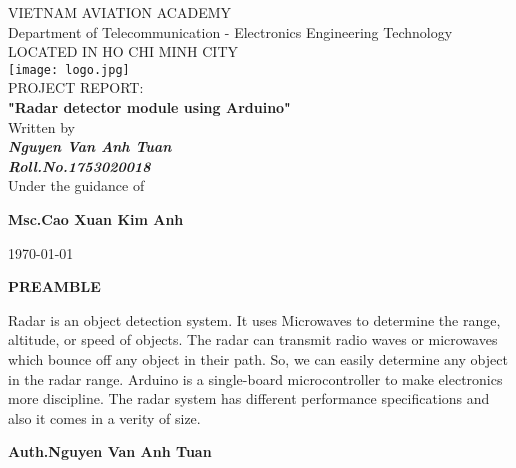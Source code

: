 \documentclass[13pt,a4paper]{report}
\begin{document}
    \newpage
        \centering
        \LARGE{\textsc{VIETNAM AVIATION ACADEMY}}\\
        \vspace{3mm}
        \normalsize{Department of Telecommunication - Electronics Engineering Technology} \\
        \vspace{3mm}
        \large{LOCATED IN HO CHI MINH CITY} \\
        \vspace{3mm}
        \texttt{[image: logo.jpg]} \\
        \vspace{3mm}
        \normalsize{PROJECT REPORT: } \\ 
        \vspace{15mm}
        \huge{\textbf{"Radar detector module using Arduino"}} \\
        \vspace{20mm}
        \normalsize{Written by} \\
        \vspace{3mm}
        \large{\textbf{\textit{Nguyen Van Anh Tuan}}} \\
        \vspace{3mm}
        \textbf{{\large{\textit{Roll.No.1753020018}}}} \\
        \vspace{15mm}
        \large{Under the guidance of} \\ 
        \vspace{10mm}
        \centerline{\textbf{\large{Msc.Cao Xuan Kim Anh}}}
        \vspace{6cm}
        \centerline{\today}
    \newpage
    \centering
    \centerline{\textbf{\huge{PREAMBLE}}}
    \vspace{10mm}
    \begin{flushleft}
        Radar is an object detection system. It uses Microwaves to determine the range, 
        altitude, or speed of objects. The radar can transmit radio waves or microwaves 
        which bounce off any object in their path. So, we can easily determine any object 
        in the radar range. Arduino is a single-board microcontroller to make electronics 
        more discipline. The radar system has different performance specifications and also 
        it comes in a verity of size.
    \end{flushleft}
    \begin{flushright}
        \textbf{Auth.Nguyen Van Anh Tuan}
    \end{flushright}
    \thispagestyle{plain}
\end{document}
